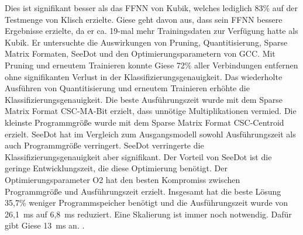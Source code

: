 Dies ist signifikant besser als das FFNN von Kubik, welches lediglich 83\% auf der Testmenge von Klisch erzielte.
Giese geht davon aus, dass sein FFNN bessere Ergebnisse erzielte, da er ca. 19-mal mehr Trainingsdaten zur Verfügung hatte als Kubik. Er untersuchte die Auswirkungen von Pruning, Quantitisierung, Sparse Matrix Formaten, SeeDot und
den Optimierungsparametern von GCC. Mit Pruning und erneutem Trainieren konnte Giese 72\% aller Verbindungen entfernen ohne signifikanten Verlust in der Klassifizierungsgenauigkeit. Das wiederholte Ausführen von Quantitisierung und
erneutem Trainieren erhöhte die Klassifizierungsgenauigkeit. Die beste Ausführungszeit wurde mit dem Sparse Matrix Format CSC-MA-Bit erzielt, dass unnötige Multiplikationen vermied. Die kleinste Programmgröße wurde mit dem
Sparse Matrix Format CSC-Centroid erzielt.
\newline
\newline
SeeDot hat im Vergleich zum Ausgangsmodell sowohl Ausführungszeit als auch Programmgröße verringert. SeeDot verringerte die Klassifizierungsgenauigkeit aber signifikant. Der Vorteil von SeeDot
ist die geringe Entwicklungszeit, die diese Optimierung benötigt. Der Optimierungsparameter O2 hat den besten Kompromiss zwischen Programmgröße und Ausführungszeit erzielt. Insgesamt hat die beste Lösung 35,7\% weniger Programmspeicher
benötigt und die Ausführungszeit wurde von 26,1~ms auf 6,8~ms reduziert. Eine Skalierung ist immer noch notwendig. Dafür gibt Giese 13~ms an. \cite{gieseThesis}.
